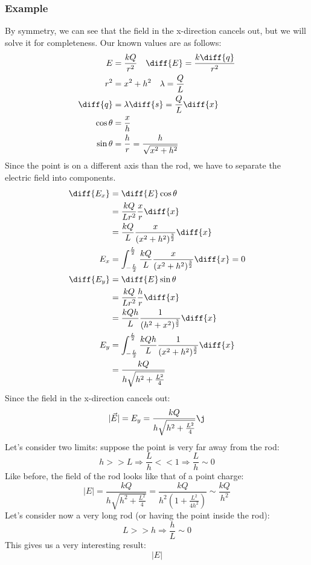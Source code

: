\documentclass{math}
\begin{document}
\subsubsection*{Example}
\begin{center}
\end{center}
By symmetry, we can see that the field in the x-direction cancels out, but we
will solve it for completeness. Our known values are as follows:
\begin{align*}
  E &= \frac{kQ}{r^2} \quad \diff{E} = \frac{k\diff{q}}{r^2} \\
  r^2 &= x^2+h^2 \quad \lambda = \frac{Q}{L} \quad \\
  \diff{q} &= \lambda\diff{s} = \frac{Q}{L}\diff{x} \\
  \cos\theta &= \frac{x}{h} \\
  \sin\theta &= \frac{h}{r} = \frac{h}{\sqrt{x^2+h^2}}
\end{align*}
Since the point is on a different axis than the rod, we have to separate the
electric field into components.
\begin{align*}
  \diff{E_x} &= \diff{E}\cos\theta \\
  &= \frac{kQ}{Lr^2}\frac{x}{r}\diff{x} \\
  &= \frac{kQ}{L}\frac{x}{(x^2+h^2)^{\frac{3}{2}}}\diff{x} \\
  E_x &= \int_{-\frac{L}{2}}^{\frac{L}{2}}
    \frac{kQ}{L}\frac{x}{(x^2+h^2)^{\frac{3}{2}}}\diff{x} = 0 \\
  \diff{E_y} &= \diff{E}\sin\theta \\
  &= \frac{kQ}{Lr^2}\frac{h}{r}\diff{x} \\
  &= \frac{kQh}{L}\frac{1}{(h^2+x^2)^{\frac{3}{2}}}\diff{x} \\
  E_y &= \int_{-\frac{L}{2}}^{\frac{L}{2}}
    \frac{kQh}{L}\frac{1}{(x^2+h^2)^{\frac{3}{2}}}\diff{x} \\
  &= \frac{kQ}{h\sqrt{h^2+\frac{L^2}{4}}}
\end{align*}
Since the field in the x-direction cancels out:
\[ |\vec{E}| = E_y = \frac{kQ}{h\sqrt{h^2+\frac{L^2}{4}}}\j \]
Let's consider two limits: suppose the point is very far away from the rod:
\[ h >> L \Rightarrow \frac{L}{h} << 1 \Rightarrow \frac{L}{h}\sim 0 \]
Like before, the field of the rod looks like that of a point charge:
\[ |E| = \frac{kQ}{h\sqrt{h^2+\frac{L^2}{4}}} =
  \frac{kQ}{h^2(1+\frac{L^2}{4h^2})} \sim \frac{kQ}{h^2} \]
Let's consider now a very long rod (or having the point inside the rod):
\[ L >> h \Rightarrow \frac{h}{L} \sim 0 \]
This gives us a very interesting result:
\[ |E| \]
\end{document}
